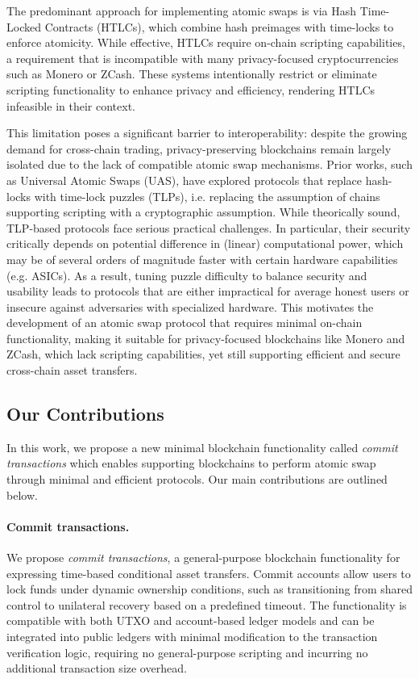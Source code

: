 The predominant approach for implementing atomic swaps is via Hash Time-Locked Contracts (HTLCs), which combine hash preimages with time-locks to enforce atomicity. While effective, HTLCs require on-chain scripting capabilities, a requirement that is incompatible with many privacy-focused cryptocurrencies such as Monero or ZCash. These systems intentionally restrict or eliminate scripting functionality to enhance privacy and efficiency, rendering HTLCs infeasible in their context.

This limitation poses a significant barrier to interoperability: despite the growing demand for cross-chain trading, privacy-preserving blockchains remain largely isolated due to the lack of compatible atomic swap mechanisms. Prior works, such as Universal Atomic Swaps (UAS), have explored protocols that replace hash-locks with time-lock puzzles (TLPs), i.e. replacing the assumption of chains supporting scripting with a cryptographic assumption. While theorically sound, TLP-based protocols face serious practical challenges. In particular, their security critically depends on potential difference in (linear) computational power, which may be of several orders of magnitude faster with certain hardware capabilities (e.g. ASICs). As a result, tuning puzzle difficulty to balance security and usability leads to protocols that are either impractical for average honest users or insecure against adversaries with specialized hardware.
This motivates the development of an atomic swap protocol that requires minimal on-chain functionality, making it suitable for privacy-focused blockchains like Monero and ZCash, which lack scripting capabilities, yet still supporting efficient and secure cross-chain asset transfers.

\subsection{Our Contributions}
In this work, we propose a new minimal blockchain functionality called \emph{commit transactions} which enables supporting blockchains to perform atomic swap through minimal and efficient protocols. Our main contributions are outlined below.

\paragraph*{Commit transactions.} We propose \emph{commit transactions}, a general-purpose blockchain functionality for expressing time-based conditional asset transfers. Commit accounts allow users to lock funds under dynamic ownership conditions, such as transitioning from shared control to unilateral recovery based on a predefined timeout. The functionality is compatible with both UTXO and account-based ledger models and can be integrated into public ledgers with minimal modification to the transaction verification logic, requiring no general-purpose scripting and incurring no additional transaction size overhead.

